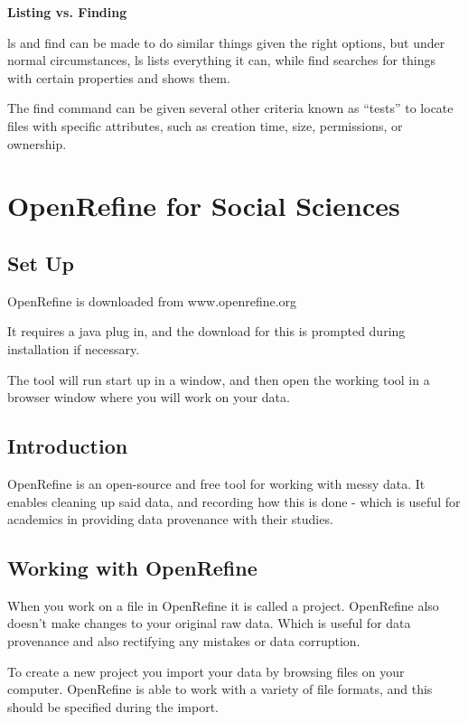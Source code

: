 \documentclass{article}
\begin{document}
\textbf{Listing vs. Finding}

ls and find can be made to do similar things given the right options, but under normal circumstances, ls lists everything it can, while find searches for things with certain properties and shows them.

The find command can be given several other criteria known as “tests” to locate files with specific attributes, such as creation time, size, permissions, or ownership. 


\pagebreak

\section{OpenRefine for Social Sciences}


\subsection{Set Up}

OpenRefine is downloaded from www.openrefine.org

It requires a java plug in, and the download for this is prompted during installation if necessary.

The tool will run start up in a window, and then open the working tool in a browser window where you will work on your data.

\subsection{Introduction}

OpenRefine is an open-source and free tool for working with messy data. It enables cleaning up said data, and recording how this is done - which is useful for academics in providing data provenance with their studies.


\subsection{Working with OpenRefine}

When you work on a file in OpenRefine it is called a project. OpenRefine also doesn't make changes to your original raw data. Which is useful for data provenance and also rectifying any mistakes or data corruption.

To create a new project you import your data by browsing files on your computer. OpenRefine is able to work with a variety of file formats, and this should be specified during the import.
\end{document}
